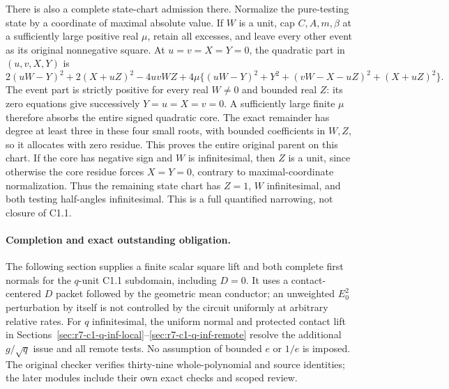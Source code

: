 There is also a complete state-chart admission there. Normalize the
pure-testing state by a coordinate of maximal absolute value. If
$W$ is a unit, cap $C,A,m,\beta$ at a sufficiently large positive
real $\mu$, retain all excesses, and leave every other event as its
original nonnegative square. At $u=v=X=Y=0$, the quadratic part in
$(u,v,X,Y)$ is
\[
 2(uW-Y)^2+2(X+uZ)^2-4uvWZ+
 4\mu\{(uW-Y)^2+Y^2+(vW-X-uZ)^2+(X+uZ)^2\}.
 \tag{SC8}
\]
The event part is strictly positive for every real $W\ne0$ and bounded
real $Z$: its zero equations give successively $Y=u=X=v=0$. A sufficiently
large finite $\mu$ therefore absorbs the entire signed quadratic core.
The exact remainder has degree at least three in these four small
roots, with bounded coefficients in $W,Z$, so it allocates with zero
residue. This proves the entire original parent on this chart.
If the core has negative sign and $W$ is infinitesimal, then $Z$ is
a unit, since otherwise the core residue forces $X=Y=0$, contrary
to maximal-coordinate normalization. Thus the remaining state chart
has $Z=1$, $W$ infinitesimal, and both testing half-angles infinitesimal.
This is a full quantified narrowing, not closure of C1.1.

\paragraph{Completion and exact outstanding obligation.}
The following section supplies a finite scalar square lift and both
complete first normals for the $q$-unit C1.1 subdomain, including
$D=0$. It uses a contact-centered $D$ packet followed by the geometric
mean conductor; an unweighted $E_0^2$ perturbation by itself is not
controlled by the circuit uniformly at arbitrary relative rates.
For $q$ infinitesimal, the uniform normal and protected contact lift
in Sections~\ref{sec:r7-c1-q-inf-local}--\ref{sec:r7-c1-q-inf-remote}
resolve the additional $g/\sqrt q$ issue and all remote tests.
No assumption of bounded $e$ or $1/e$ is imposed. The original
checker verifies thirty-nine whole-polynomial and source identities;
the later modules include their own exact checks and scoped review.
